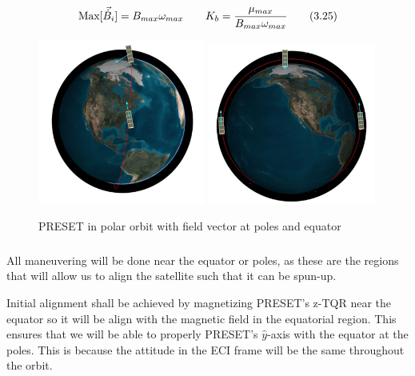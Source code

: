 \documentclass{article}
\begin{document}
\begin{align}
   \textup{Max}[\vec{\dot{B}}_{i}] =  B_{max} \omega_{max} \qquad K_{b} = \frac{\mu_{max}}{B_{max} \omega_{max}} \tag{3.25}
\end{align}

\begin{figure}[H]
    \centering
    \includegraphics[width=0.49\textwidth]{Edge On w Satellite.jpg}
    \includegraphics[width=0.49\textwidth]{Face On w Satellite.jpg}   
    \caption{PRESET in polar orbit with  field vector at poles and equator}
    \label{fig:enter-label}
\end{figure}

\subsubsection{\color{black}{Initial Alignment}}

All maneuvering will be done near the equator or poles, as these are the regions that will allow us to align the satellite such that it can be spun-up. 

Initial alignment shall be achieved by magnetizing PRESET's z-TQR near the equator so it will be align with the magnetic field in the equatorial region. This ensures that we will be able to properly PRESET's $\hat{y}$-axis with the equator at the poles. This is because the attitude in the ECI frame will be the same throughout the orbit.
\end{document}
